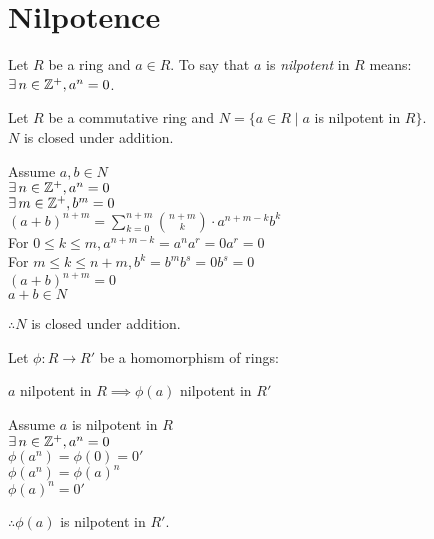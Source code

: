 \documentclass[letterpaper,12pt,fleqn]{article}
\begin{document}
\section*{Nilpotence}

\begin{definition}
  Let $R$ be a ring and $a\in R$. To say that $a$ is \emph{nilpotent} in $R$
  means: $\exists\,n\in\mathbb{Z}^+,a^n=0$.
\end{definition}

\begin{theorem}
  Let $R$ be a commutative ring and $N=\{a\in R\mid a$ is nilpotent in $R\}$. \\
  $N$ is closed under addition.
\end{theorem}

\begin{theproof}
  Assume $a,b\in N$ \\
  $\exists\,n\in\mathbb{Z}^+,a^n=0$ \\
  $\exists\,m\in\mathbb{Z}^+,b^m=0$ \\
  $(a+b)^{n+m}=\sum_{k=0}^{n+m}\binom{n+m}{k}\cdot a^{n+m-k}b^k$ \\
  For $0\le k\le m, a^{n+m-k}=a^na^r=0a^r=0$ \\
  For $m\le k\le n+m, b^k=b^mb^s=0b^s=0$ \\
  $(a+b)^{n+m}=0$ \\
  $a+b\in N$

  $\therefore N$ is closed under addition.
\end{theproof}

\begin{theorem}
  Let $\phi:R\to R'$ be a homomorphism of rings:

  $a$ nilpotent in $R\implies\phi(a)$ nilpotent in $R'$
\end{theorem}

\begin{theproof}
  Assume $a$ is nilpotent in $R$ \\
  $\exists\,n\in\mathbb{Z}^+,a^n=0$ \\
  $\phi(a^n)=\phi(0)=0'$ \\
  $\phi(a^n)=\phi(a)^n$ \\
  $\phi(a)^n=0'$

  $\therefore\phi(a)$ is nilpotent in $R'$.
\end{theproof}
\end{document}

